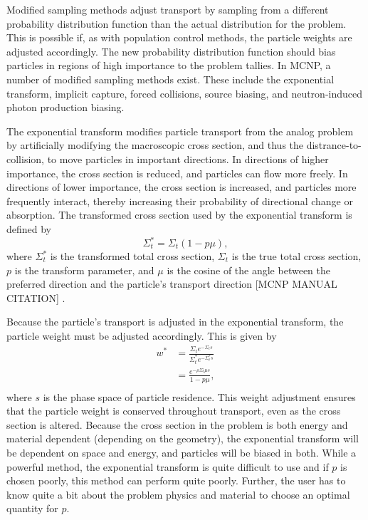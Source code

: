 Modified sampling methods adjust transport by sampling from a different probability
distribution function than the actual distribution for the problem. This is
possible if, as with population control methods, the particle weights are adjusted
 accordingly.
 The new probability distribution function should bias particles in regions of high
 importance to the problem tallies. In MCNP, a number of modified sampling
 methods exist.
 These include the exponential transform, implicit capture, forced collisions, source
 biasing, and neutron-induced photon production biasing.

The exponential transform modifies particle transport from the analog problem by
artificially modifying the macroscopic cross section, and thus the
distrance-to-collision, to move particles in important directions. In directions
of higher importance, the cross section is reduced, and particles can flow more
freely. In directions of lower importance, the cross section is increased, and
particles more frequently interact, thereby increasing their probability of
directional change or absorption. The transformed cross section used by the
exponential transform is defined by
%
\begin{equation*}
  \Sigma_t^* = \Sigma_t(1-p\mu) ,
\end{equation*}
%
where $\Sigma_t^*$ is the transformed total cross section, $\Sigma_t$ is the
true total cross section, $p$ is the transform parameter, and $\mu$ is the
cosine of the angle between the preferred direction and the particle's transport
direction [MCNP MANUAL CITATION] \cite{hendricks_mcnp_1985}.

Because the particle's transport is adjusted in the exponential transform, the
particle weight must be adjusted accordingly. This is given by
%
\begin{equation*}
  \begin{split}
  w^* &= \frac{\Sigma_t e^{-\Sigma_t s}}{\Sigma_t^* e^{-\Sigma_t^* s}} \\
      &= \frac{e^{-\rho \Sigma_t \mu s}}{1-p\mu}, \\
  \end{split}
\end{equation*}
%
where $s$ is the phase space of particle residence. This weight adjustment
ensures that the particle weight is conserved throughout transport, even as
the cross section is altered. Because the cross section in the problem is both
energy and material dependent (depending on the geometry), the exponential
transform will be dependent on space and energy, and particles will be biased in
both. While a powerful method, the exponential transform is quite difficult to
use and if $p$ is chosen poorly, this method can perform quite poorly. Further,
the user has to know quite a bit about the problem physics and material to choose an
optimal quantity for $p$.

